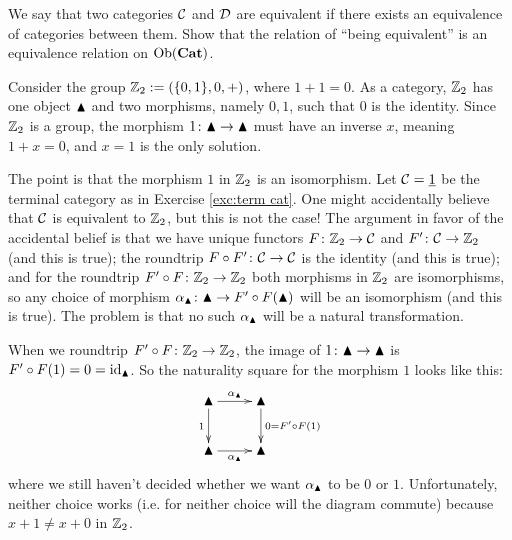 \documentclass[CT4S-EN-RU]{subfiles}
\begin{document}
\begin{exerciseRUS}
\end{exerciseRUS}

\begin{exerciseENG}
We say that two categories $\mathcal{C}$ and $\mathcal{D}$ are equivalent if there exists an equivalence of categories between them. Show that the relation of “being equivalent” is an equivalence relation on $\textnormal{Ob}({\bf Cat})$.
\end{exerciseENG}

\begin{exerciseRUS}
\end{exerciseRUS}

\begin{exampleENG}\label{ex:Z1 not equiv Z2}
Consider the group ${\mathbb Z}_2:=(\{0,1\},0,+)$, where $1+1=0$. As a category, ${\mathbb Z}_2$ has one object $\blacktriangle$ and two morphisms, namely $0,1$, such that $0$ is the identity. Since ${\mathbb Z}_2$ is a group, the morphism $1\colon\blacktriangle\rightarrow\blacktriangle$ must have an inverse $x$, meaning $1+x=0$, and $x=1$ is the only solution.

The point is that the morphism $1$ in ${\mathbb Z}_2$ is an isomorphism. Let $\mathcal{C}=\underline{1}$ be the terminal category as in Exercise \ref{exc:term cat}. One might accidentally believe that $\mathcal{C}$ is equivalent to ${\mathbb Z}_2$, but this is not the case! The argument in favor of the accidental belief is that we have unique functors $F\colon{\mathbb Z}_2\rightarrow\mathcal{C}$ and $F'\colon\mathcal{C}\rightarrow{\mathbb Z}_2$ (and this is true); the roundtrip $F\circ F'\colon\mathcal{C}\rightarrow\mathcal{C}$ is the identity (and this is true); and for the roundtrip $F'\circ F\colon{\mathbb Z}_2\rightarrow{\mathbb Z}_2$ both morphisms in ${\mathbb Z}_2$ are isomorphisms, so any choice of morphism $\alpha_\blacktriangle\colon\blacktriangle\rightarrow F'\circ F(\blacktriangle)$ will be an isomorphism (and this is true). The problem is that no such $\alpha_\blacktriangle$ will be a natural transformation.

When we roundtrip $F'\circ F\colon{\mathbb Z}_2\rightarrow{\mathbb Z}_2$, the image of $1\colon\blacktriangle\rightarrow\blacktriangle$ is $F'\circ F(1)=0=\textnormal{id}_{\blacktriangle}$. So the naturality square for the morphism $1$ looks like this:
$$
\xymatrix{\monOb\ar[r]^{\alpha_\monOb}\ar[d]_{1}&\monOb\ar[d]^{0=F'\circ F(1)}\\\monOb\ar[r]_{\alpha_\monOb}&\monOb}
$$
where we still haven't decided whether we want $\alpha_\blacktriangle$ to be $0$ or $1$. Unfortunately, neither choice works (i.e. for neither choice will the diagram commute) because $x+1\neq x+0$ in ${\mathbb Z}_2$.
\end{exampleENG}

\begin{exampleRUS}\label{ex:Z1 not equiv Z2}
\end{exampleRUS}
\end{document}
